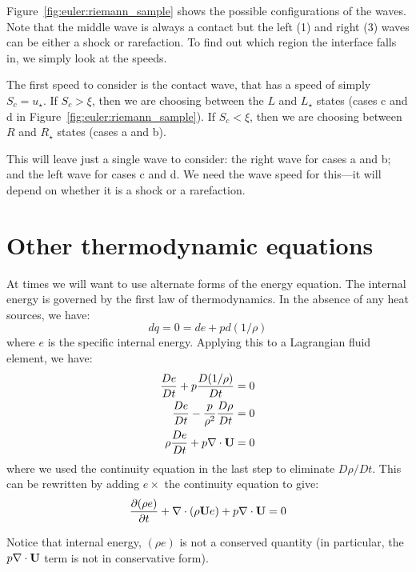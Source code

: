 Figure~\ref{fig:euler:riemann_sample} shows the possible
configurations of the waves.  Note that the middle wave is always a
contact but the left (1) and right (3) waves can be either a shock or
rarefaction.  To find out which region the interface falls in, we simply
look at the speeds.  

The first speed to consider is the contact wave, that has a speed of
simply $S_c = u_\star$.  If $S_c > \xi$, then we are choosing between
the $L$ and $L_\star$ states (cases c and d in
Figure~\ref{fig:euler:riemann_sample}).  If $S_c < \xi$, then we are
choosing between $R$ and $R_\star$ states (cases a and b).

This will leave just a single wave to consider: the right wave for
cases a and b; and the left wave for cases c and d.  We need the wave
speed for this---it will depend on whether it is a shock or a
rarefaction.



\section{Other thermodynamic equations}

At times we will want to use alternate forms of the energy equation.  The
internal energy is governed by the first law of thermodynamics.  In the
absence of any heat sources, we have:
\begin{equation}
dq = 0 = de + pd(1/\rho)
\end{equation}
where $e$ is the specific internal energy.
Applying this to a Lagrangian fluid element, we have:
\begin{align}
{\frac{{De}}{D t}} + p {\frac{{D(1/\rho)}}{D t}} &= 0 \\
{\frac{{De}}{D t}} - \frac{p}{\rho^2} \frac{D\rho}{Dt} &= 0 \\
\rho \frac{De}{Dt} + p \nabla \cdot {\bf U} &= 0
\end{align}
where we used the continuity equation in the last step to eliminate
$D\rho/Dt$.  This can be rewritten by adding $e \times$ the continuity
equation to give:
\begin{equation}
{\frac{{\partial(\rho e)}}{\partial t}} + \nabla \cdot (\rho {\bf U} e) + p \nabla \cdot {\bf U} = 0 \label{eq:euler:econs}
\end{equation}

Notice that internal energy, $(\rho e)$ is not a conserved quantity
(in particular, the $p\nabla \cdot {\bf U}$ term is not in conservative
form).  

